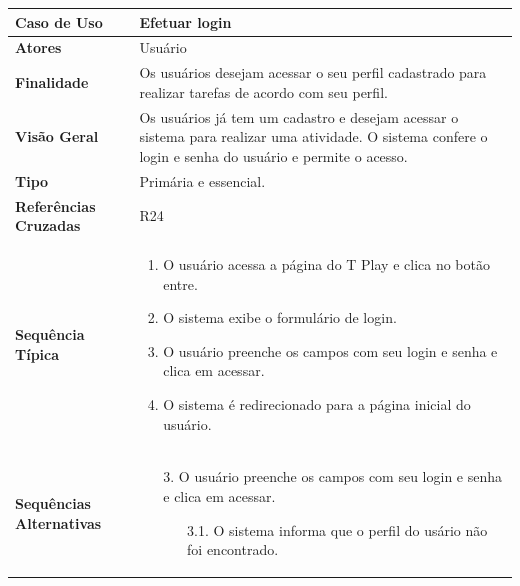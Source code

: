 \documentclass[a4paper,11pt]{article}
\begin{document}
\begin{table}[H]
		\begin{tabularx}{\textwidth}{|l|X|}
		\hline
			\textbf{Caso de Uso} &  Efetuar login \\ \hline
			\textbf{Atores} &  Usuário  \\ \hline
			\textbf{Finalidade} & Os usuários desejam acessar o seu perfil cadastrado para realizar tarefas de acordo com seu perfil.  \\ \hline
			\textbf{Visão Geral} & Os usuários já tem um cadastro e desejam acessar o sistema para realizar uma atividade. O sistema confere o login e senha do usuário e permite o acesso. \\ \hline
			\textbf{Tipo} &  Primária e essencial. \\ \hline
			\textbf{Referências Cruzadas} & R24 \\ \hline
			\textbf{Sequência Típica} & 
			\begin{enumerate}
			\item O usuário acessa a página do T Play e clica no botão entre.
			\item O sistema exibe o formulário de login.
			\item O usuário preenche os campos com seu login e senha e clica em acessar.
			\item O sistema é redirecionado para a página inicial do usuário.
			\end{enumerate} \\ \hline
			
			\textbf{Sequências Alternativas} & 
			\begin{itemize}
				\item[3.] O usuário preenche os campos com seu login e senha e clica em acessar.
				\begin{itemize}
					\item[3.1.] O sistema informa que o perfil do usário não foi encontrado.
				\end{itemize}
			\end{itemize} \\ \hline
		\end{tabularx}
\end{table}
\end{document}
